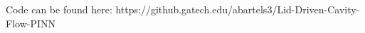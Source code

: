\documentclass{article}
\begin{document}
%	

	Code can be found here: https://github.gatech.edu/abartels3/Lid-Driven-Cavity-Flow-PINN
	
\end{document}
